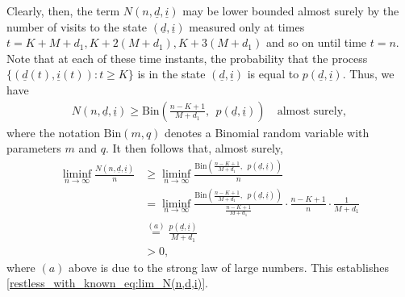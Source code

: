 Clearly, then, the term $N(n,\underline{d},\underline{i})$ may be lower bounded almost surely by the number of visits to the state $(\underline{d},\underline{i})$ measured only at times $t=K+M+d_1, K+2(M+d_1),K+3(M+d_1)$ and so on until time $t=n$. Note that at each of these time instants, the probability that the process $\{(\underline{d}(t),\underline{i}(t)):t\geq K\}$ is in the state $(\underline{d},\underline{i})$ is equal to $p(\underline{d},\underline{i})$. Thus, we have
\begin{align}
N(n,\underline{d},\underline{i})\geq \text{Bin}\left(\frac{n-K+1}{M+d_1},~~p(\underline{d}, \underline{i})\right)\quad \text{almost surely},\label{restless_with_known_eq:N(n,d,i)_lower_bounded_by_binomial}
\end{align}
where the notation $\text{Bin}(m,q)$ denotes a Binomial random variable with parameters $m$ and $q$. It then follows that, almost surely,
\begin{align}
\liminf\limits_{n\to\infty}\frac{N(n,\underline{d},\underline{i})}{n}&\geq \liminf\limits_{n\to\infty}\frac{\text{Bin}\left(\frac{n-K+1}{M+d_1},~~p(\underline{d}, \underline{i})\right)}{n}\nonumber\\
&=\liminf\limits_{n\to\infty} \frac{\text{Bin}\left(\frac{n-K+1}{M+d_1},~~p(\underline{d}, \underline{i})\right)}{\frac{n-K+1}{M+d_1}}\cdot \frac{n-K+1}{n}\cdot \frac{1}{M+d_1}\nonumber\\
&\stackrel{(a)}{=}\frac{p(\underline{d}, \underline{i})}{M+d_1}\nonumber\\
&>0,\label{restless_with_known_eq:liminf_N(n,d,i)_strictly positive}
\end{align}
where $(a)$ above is due to the strong law of large numbers. This establishes \eqref{restless_with_known_eq:lim_N(n,d,i)}.

